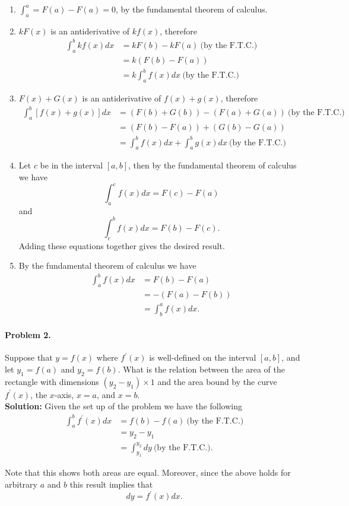 \documentclass{article}
\begin{document}
\begin{enumerate}
\item	$\int_{a}^{a}=F(a)-F(a)=0$, by the fundamental theorem of calculus. 
\item	$kF(x)$ is an antiderivative of $kf(x)$, therefore
\begin{align*}
\int_{a}^{b}kf(x)dx&=kF(b)-kF(a)~\text{(by the F.T.C.)} \\
&=k\left(F(b)-F(a)\right) \\
&=k\int_{a}^{b}f(x)dx~\text{(by the F.T.C.)}
\end{align*}
\item	$F(x)+G(x)$ is an antiderivative of $f(x)+g(x)$, therefore
\begin{align*}
\int_{a}^{b}[f(x)+g(x)]dx&=\left(F(b)+G(b)\right)-\left(F(a)+G(a)\right)~\text{(by the F.T.C.)}\\
&=\left(F(b)-F(a)\right)+\left(G(b)-G(a)\right) \\
&=\int_{a}^{b}f(x)dx+\int_{a}^{b}g(x)dx~\text{(by the F.T.C.)}
\end{align*}
\item	Let $c$ be in the interval $[a,b]$, then by the fundamental theorem of calculus we have
\[
\int_{a}^{c}f(x)dx=F(c)-F(a)
\]
and
\[
\int_{c}^{b}f(x)dx=F(b)-F(c).
\]
Adding these equations together gives the desired result. 
\item	By the fundamental theorem of calculus we have
\begin{align*}
\int_{a}^{b}f(x)dx&=F(b)-F(a) \\
&=-\left(F(a)-F(b)\right) \\
&=\int_{b}^{a}f(x)dx.
\end{align*}
\end{enumerate}

\paragraph*{Problem 2.} Suppose that $y=f(x)$ where $f^{'}(x)$ is well-defined on the interval $[a,b]$, and let $y_{1}=f(a)$ and $y_{2}=f(b)$. What is the relation between the area of the rectangle with dimensions $(y_{2}-y_{1})\times 1$ and the area bound by the curve $f^{'}(x)$, the $x$-axis, $x=a$, and $x=b$. 
~\\
\textbf{Solution:} Given the set up of the problem we have the following
\begin{align*}
\int_{a}^{b}f^{'}(x)dx&=f(b)-f(a)~\text{(by the F.T.C.)} \\
&=y_{2}-y_{1} \\
&=\int_{y_{1}}^{y_{2}}dy~\text{(by the F.T.C.)}.
\end{align*}

Note that this shows both areas are equal. Moreover, since the above holds for arbitrary $a$ and $b$ this result implies that
\[
dy=f^{'}(x)dx.
\]
\end{document}
